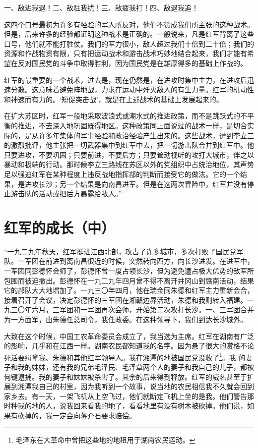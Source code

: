 \documentclass[10pt]{book}
\begin{document}
一、敌进我退！二、敌驻我扰！三、敌疲我打！四、敌退我追！

这四个口号最初为许多有经验的军人所反对，他们不赞成我们所主张的这种战术。但是，后来许多的经验都证明这种战术是正确的。一般说来，凡是红军背离了这些口号，他们就不能打胜仗。我们的军力很小，敌人超过我们十倍到二十倍；我们的资源和作战物资有限，只有把运动战术和游击战术巧妙地结合起来，我们才能有希望在反对国民党的斗争中取得胜利，因为国民党是在雄厚得多的基础上作战的。

红军的最重要的一个战术，过去是，现在仍然是，在进攻时集中主力，在进攻后迅速分散。这意味着避免阵地战，力求在运动中歼灭敌人的有生力量。红军的机动性和神速而有力的。‘短促突击战’，就是在上述战术的基础上发展起来的。

在扩大苏区时，红军一般地采取波浪式或潮水式的推进政策，而不是跳跃式的不平衡的推进，不去深入地巩固既得地区。这种政策同上面说过的战术一样，是切合实际的，是从许多年集体的军事经验和政治经验产生出来的。这些战术，遭到李立三的激烈批评，他主张把一切武器集中到红军中去，把一切游击队合并到红军中。他只要进攻，不要巩固；只要前进，不要后方；只要耸动视听的攻打大城市，伴之以暴动和极端的行动。那时候李立三路线在苏区以外的党组织中占统治地位，其声势足以强迫红军在某种程度上违反战地指挥部的判断而接受它的做法。它的一个结果，是进攻长沙；另一个结果是向南昌进军。但是在这两次冒险中，红军并没有停止游击队的活动或把后方暴露给敌人。”



\section{红军的成长（中）}

“一九二九年秋天，红军挺进江西北部，攻占了许多城市，多次打败了国民党军队。一军团在前进到离南昌很近的时候，突然转向西方，向长沙进发。在进军中，一军团同彭德怀会师了，彭德怀曾一度占领长沙，但为避免遭占极大优势的敌军所包围而被迫撤出。彭德怀在一九二九年四月曾不得不离开井冈山到赣南活动，结果它的部队大大地增加了。一九三〇年四月，他在瑞金同朱德和红军主力重新会合，接着召开了会议，决定彭德怀的三军团在湘赣边界活动，朱德和我则转入福建。一九三〇年六月，三军团和一军团再次会师，开始第二次攻打长沙。一、三军团合并为一方面军，由朱德任总司令，我任政委。在这种领导下，我们到达长沙城外。

大致在这个时候，中国工农革命委员会成立了，我当选为主席。红军在湖南有广泛的影响，几乎和在江西一样。湖南农民都知道我的名字。因为悬了很大的赏格不论死活要缉拿我、朱德和其他红军领导人。我在湘潭的地被国民党没收了\footnote{毛泽东在大革命中曾把这些地的地租用于湖南农民运动。}。我 的妻子和我的妹妹，还有我的兄弟毛泽民、毛泽覃两个人的妻子和我自己的儿子，都被何键逮捕。我的妻子和妹妹被杀害了。其余的后来得到释放。红军的威名甚至于扩展到湘潭我自己的村里，因为我听到一个故事，说当地的农民相信我不久就会回到家乡去。有一天，一架飞机从上空飞过，他们就断定飞机上坐的是我。他们警告那时种我的地的人，说我回来看我的地了，看看地里有没有树木被砍掉。他们说，如果有砍掉的，我一定会向蒋介石要求赔偿。
\end{document}
